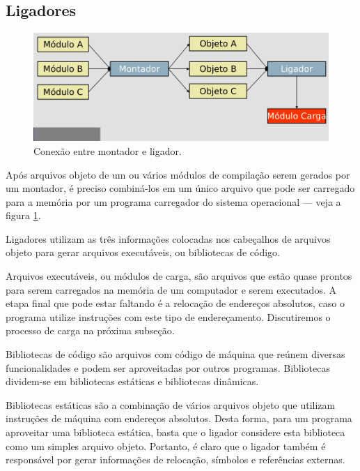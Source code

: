 \subsection{Ligadores}

\begin{figure}[ptb]
  \begin{center}
    \includegraphics[scale=.6]{imagens/1_ligador}
  \end{center}
  \caption{Conexão entre montador e ligador.}
  \label{ligador}
\end{figure}

Após arquivos objeto de um ou vários módulos de compilação serem gerados por um
montador, é preciso combiná-los em um único arquivo que pode ser carregado para
a memória por um programa carregador do sistema operacional --- veja a figura
\ref{ligador}.

Ligadores utilizam as três informações colocadas nos cabeçalhos de arquivos
objeto para gerar arquivos executáveis, ou bibliotecas de código.

Arquivos executáveis, ou módulos de carga, são arquivos que estão quase prontos
para serem carregados na memória de um computador e serem executados. A etapa
final que pode estar faltando é a relocação de endereços absolutos, caso o
programa utilize instruções com este tipo de endereçamento. Discutiremos o
processo de carga na próxima subseção.

Bibliotecas de código são arquivos com código de máquina que reúnem diversas
funcionalidades e podem ser aproveitadas por outros programas. Bibliotecas
dividem-se em bibliotecas estáticas e bibliotecas dinâmicas.

Bibliotecas estáticas são a combinação de vários arquivos objeto que utilizam
instruções de máquina com endereços absolutos. Desta forma, para um programa
aproveitar uma biblioteca estática, basta que o ligador considere esta
biblioteca como um simples arquivo objeto. Portanto, é claro que o ligador
também é responsável por gerar informações de relocação, símbolos e referências
externas.

